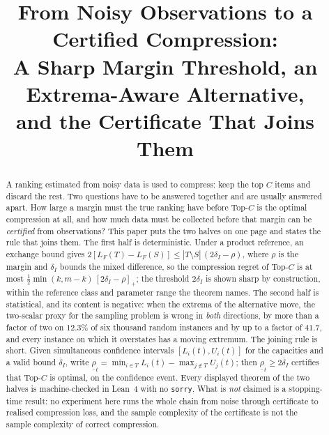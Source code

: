 \documentclass[conference]{IEEEtran}
\theoremstyle{definition}
\begin{document}
\title{From Noisy Observations to a Certified Compression:\\
A Sharp Margin Threshold, an Extrema-Aware Alternative,\\
and the Certificate That Joins Them}

\author{
}

\maketitle

\begin{abstract}
A ranking estimated from noisy data is used to compress: keep the top $C$ items and
discard the rest. Two questions have to be answered together and are usually answered apart.
How large a margin must the true ranking have before Top-$C$ is the optimal compression at
all, and how much data must be collected before that margin can be \emph{certified} from
observations? This paper puts the two halves on one page and states the rule that joins them.
The first half is deterministic. Under a product reference, an exchange bound gives
$2[L_{F}(T)-L_{F}(S)]\le|T\setminus S|\,(2\delta_{I}-\rho)$, where $\rho$ is the margin and
$\delta_{I}$ bounds the mixed difference, so the compression regret of Top-$C$ is at most
$\tfrac12\min(k,m-k)\,[2\delta_{I}-\rho]_{+}$; the threshold $2\delta_{I}$ is shown sharp by
construction, within the reference class and parameter range the theorem names. The second
half is statistical, and its content is negative: when the extrema of the alternative move,
the two-scalar proxy for the sampling problem is wrong in \emph{both} directions, by more
than a factor of two on $12.3\%$ of six thousand random instances and by up to a factor of
$41.7$, and every instance on which it overstates has a moving extremum. The joining rule is
short. Given simultaneous confidence intervals $[L_{i}(t),U_{i}(t)]$ for the capacities and a
valid bound $\overline{\delta}_{I}$, write
$\underline{\rho}_{t}=\min_{i\in T}L_{i}(t)-\max_{j\notin T}U_{j}(t)$; then
$\underline{\rho}_{t}\ge2\overline{\delta}_{I}$ certifies that Top-$C$ is optimal, on the
confidence event. Every displayed theorem of the two halves is machine-checked in Lean~4 with
no \texttt{sorry}. What is \emph{not} claimed is a stopping-time result: no experiment here
runs the whole chain from noise through certificate to realised compression loss, and the
sample complexity of the certificate is not the sample complexity of correct compression.
\end{abstract}
\end{document}
